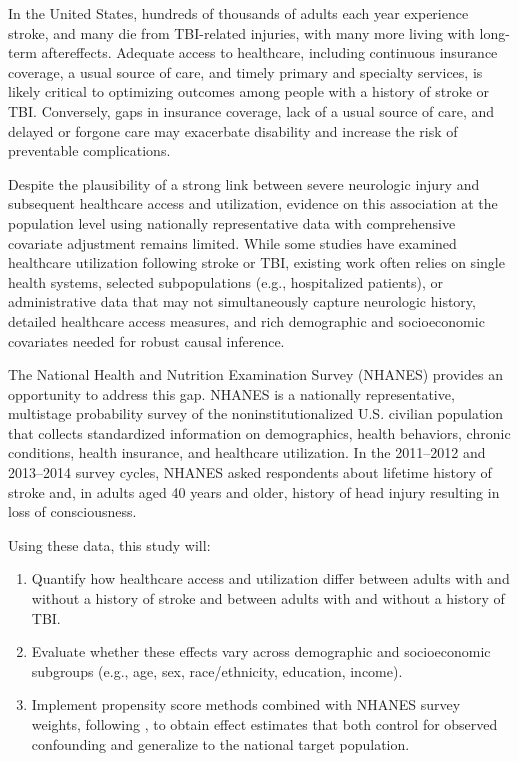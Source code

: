 \documentclass{article}
\begin{document}
In the United States, hundreds of thousands of adults each year experience stroke, and many die from TBI-related injuries, with many more living with long-term aftereffects. Adequate access to healthcare, including continuous insurance coverage, a usual source of care, and timely primary and specialty services, is likely critical to optimizing outcomes among people with a history of stroke or TBI. Conversely, gaps in insurance coverage, lack of a usual source of care, and delayed or forgone care may exacerbate disability and increase the risk of preventable complications.

Despite the plausibility of a strong link between severe neurologic injury and subsequent healthcare access and utilization, evidence on this association at the population level using nationally representative data with comprehensive covariate adjustment remains limited. While some studies have examined healthcare utilization following stroke or TBI, existing work often relies on single health systems, selected subpopulations (e.g., hospitalized patients), or administrative data that may not simultaneously capture neurologic history, detailed healthcare access measures, and rich demographic and socioeconomic covariates needed for robust causal inference.

The National Health and Nutrition Examination Survey (NHANES) provides an opportunity to address this gap. NHANES is a nationally representative, multistage probability survey of the noninstitutionalized U.S. civilian population that collects standardized information on demographics, health behaviors, chronic conditions, health insurance, and healthcare utilization. In the 2011--2012 and 2013--2014 survey cycles, NHANES asked respondents about lifetime history of stroke and, in adults aged 40 years and older, history of head injury resulting in loss of consciousness.

Using these data, this study will:

\begin{enumerate}
    \item Quantify how healthcare access and utilization differ between adults with and without a history of stroke and between adults with and without a history of TBI.

    \item Evaluate whether these effects vary across demographic and socioeconomic subgroups (e.g., age, sex, race/ethnicity, education, income).

    \item Implement propensity score methods combined with NHANES survey weights, following \citet{dugoff2014}, to obtain effect estimates that both control for observed confounding and generalize to the national target population.

\end{enumerate}
\end{document}
